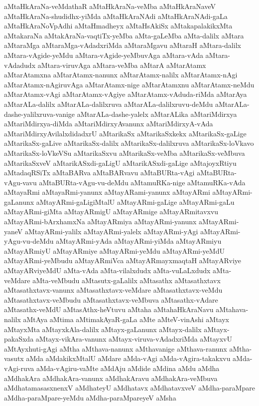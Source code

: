{aMtaHkAraNa-veMdathaR
aMtaHkAraNa-veMba
aMtaHkAraNaveV
aMtaHkAraNa-shudidhx-yiMda
aMtaHkAraNAdi
aMtaHkAraNAdi-gaLa
aMtaHkAraNoVpAdhi
aMtaHmadheyx
aMtaHsAkiSx
aMtakapalakikxMta
aMtakaraNa
aMtakAraNa-vaqtiTx-yeMba
aMta-gaLeMba
aMta-dalilx
aMtara
aMtaraMga
aMtaraMga-vAdadxriMda
aMtaraMgavu
aMtaraH
aMtara-dalilx
aMtara-vAgide-yeMdu
aMtara-vAgide-yeMbuvAga
aMtara-vAda
aMtara-vAdadudx
aMtara-viruvAga
aMtara-veMba
aMtarA
aMtarAtamx
aMtarAtamxna
aMtarAtamx-nanunx
aMtarAtamx-nalilx
aMtarAtamx-nAgi
aMtarAtamx-nAgiruvAga
aMtarAtamx-nige
aMtarAtamxnu
aMtarAtamx-neMdu
aMtarAtamx-vAgi
aMtarAtamx-vAgiye
aMtarAtamx-vAduda-riMda
aMtarAya
aMtarALa-dalilx
aMtarALa-dalilxruva
aMtarALa-dalilxruvu-deMdu
aMtarALa-dashe-yalilxruva-vanige
aMtarALa-dashe-yalelx
aMtarALika
aMtariMdirxya
aMtariMdirxya-diMda
aMtariMdirxyAvanunx
aMtariMdirxyA-vAda
aMtariMdirxyAvilalxdidadxrU
aMtarikaSx
aMtarikaSxkekx
aMtarikaSx-gaLige
aMtarikaSx-gaLive
aMtarikaSx-dalilx
aMtarikaSx-dalilxruva
aMtarikaSx-loVkavo
aMtarikaSx-loVkeVSu
aMtarikaSxvu
aMtarikaSx-veMba
aMtarikaSx-veMbuva
aMtarikaSxveV
aMtarikASxdi-gaLigU
aMtarikASxdi-gaLige
aMtajoyxRtiyu
aMtadaqRSiTx
aMtaBARva
aMtaBARvavu
aMtaBURta-vAgi
aMtaBURta-vAgu-vavu
aMtaBURta-vAgu-vu-deMdu
aMtamuRKa-nige
aMtamuRKa-vAda
aMtayaRmi
aMtayaRmi-yanunx
aMtayARami-yanunx
aMtayARmi
aMtayARmi-gaLanunx
aMtayARmi-gaLigiMtalU
aMtayARmi-gaLige
aMtayARmi-gaLu
aMtayARmi-giMta
aMtayARmigU
aMtayARmige
aMtayARmitavxvu
aMtayARmi-bArxhamxNa
aMtayARmiya
aMtayARmi-yanunx
aMtayARmi-yaneV
aMtayARmi-yalilx
aMtayARmi-yalelx
aMtayARmi-yAgi
aMtayARmi-yAgu-vu-deMdu
aMtayARmi-yAda
aMtayARmi-yiMda
aMtayARmiyu
aMtayARmiyU
aMtayARmiye
aMtayARmi-yeMdu
aMtayARmi-yeMdU
aMtayARmi-yeMbudu
aMtayARmiVca
aMtayARmayxmaqtaH
aMtayARviye
aMtayARviyeMdU
aMta-vAda
aMta-vilalxdudx
aMta-vuLaLxdudx
aMta-veMdare
aMta-veMbudu
aMtasutx-gaLalilx
aMtasathx
aMtasathxtavx
aMtasathxtavx-vanunx
aMtasathxtavx-veMdare
aMtasathxtavx-veMdu
aMtasathxtavx-veMbudu
aMtasathxtavx-veMbuva
aMtasathx-vAdare
aMtasathx-veMdU
aMtasAthx-heVtuvu
aMtaha
aMtahaHkAraNavu
aMtahava-nalilx
aMtAya
aMtima
aMtimakAyaR-gaLa
aMte
aMteV-vinAshi
aMtayx
aMtayxMta
aMtayxkAla-dalilx
aMtayx-gaLanunx
aMtayx-dalilx
aMtayx-pakaSxda
aMtayx-vikAra-vanunx
aMtayx-viruva-vAdadxriMda
aMtayxvU
aMtAyxhuti-gAgi
aMtha
aMthava-nanunx
aMthavanige
aMthava-ranunx
aMtha-vasutx
aMda
aMdakikxMtalU
aMdare
aMda-vAgi
aMda-vAgira-takakxvu
aMda-vAgi-ruva
aMda-vAgiru-vaMte
aMdAju
aMdide
aMdina
aMdu
aMdha
aMdhakAra
aMdhakAra-vanunx
aMdhakAravu
aMdhakAra-veMbuva
aMdhatamasasxnenxV
aMdhateyU
aMdhatavx
aMdhatavxveV
aMdha-paraMpare
aMdha-paraMpare-yeMdu
aMdha-paraMpareyeV
aMsha
}
